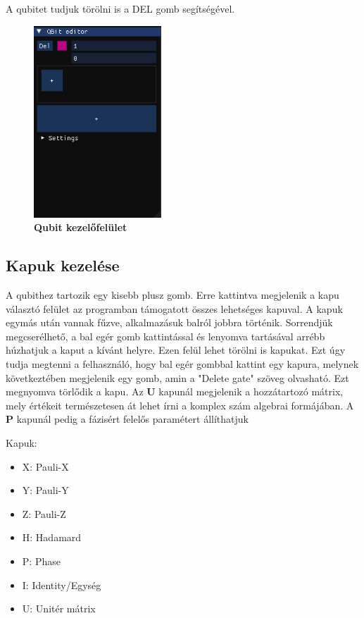 \documentclass[fontsize=12pt,a4paper]{article}
\begin{document}
A qubitet tudjuk törölni is a DEL gomb segítségével.

\begin{figure}[h]
    \centering
    \includegraphics[height=7.2cm]{App/add_qubit.png}
    \caption{\textbf{Qubit kezelőfelület}}
\end{figure}

\subsection{Kapuk kezelése}
A qubithez tartozik egy kisebb plusz gomb. Erre kattintva megjelenik a kapu választó felület az programban támogatott összes lehetséges kapuval. A kapuk egymás után vannak fűzve, alkalmazásuk balról jobbra történik. 
Sorrendjük megcserélhető, a bal egér gomb kattintással és lenyomva tartásával arrébb húzhatjuk a kaput a kívánt helyre. 
Ezen felül lehet törölni is kapukat. Ezt úgy tudja megtenni a felhasználó, hogy bal egér gombbal kattint egy kapura, melynek következtében megjelenik egy gomb, amin a "Delete gate" szöveg olvasható. Ezt megnyomva törlődik a kapu. Az \textbf{U} kapunál megjelenik a hozzátartozó mátrix, mely értékeit természetesen át lehet írni a komplex szám algebrai formájában. A \textbf{P} kapunál pedig a fázisért felelős paramétert állíthatjuk

Kapuk:
\begin{itemize}
    \item X: Pauli-X
    \item Y: Pauli-Y
    \item Z: Pauli-Z
    \item H: Hadamard
    \item P: Phase
    \item I: Identity/Egység
    \item U: Unitér mátrix
\end{itemize}
\end{document}
